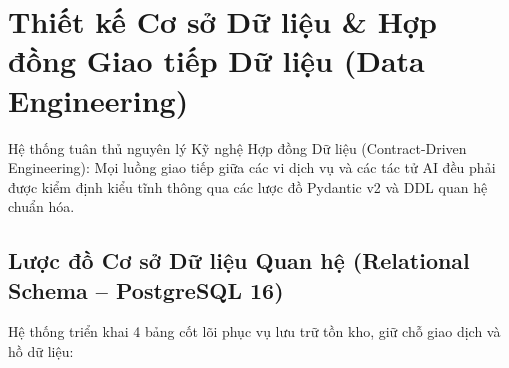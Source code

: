 \section{Thiết kế Cơ sở Dữ liệu \& Hợp đồng Giao tiếp Dữ liệu (Data Engineering)}
\label{sec:thiet_ke_csdl}

Hệ thống tuân thủ nguyên lý Kỹ nghệ Hợp đồng Dữ liệu (Contract-Driven Engineering): Mọi luồng giao tiếp giữa các vi dịch vụ và các tác tử AI đều phải được kiểm định kiểu tĩnh thông qua các lược đồ Pydantic v2 và DDL quan hệ chuẩn hóa.

\subsection{Lược đồ Cơ sở Dữ liệu Quan hệ (Relational Schema -- PostgreSQL 16)}
\label{subsec:relational_ddl}

Hệ thống triển khai 4 bảng cốt lõi phục vụ lưu trữ tồn kho, giữ chỗ giao dịch và hồ dữ liệu:


